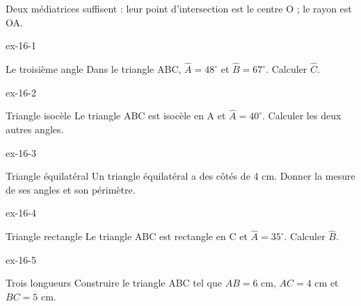 \begin{savoirfaire}Deux médiatrices suffisent : leur point d’intersection est le centre O ; le rayon est OA.\end{savoirfaire}

\clearpage{}
\begin{blocLivre}{ex-16-1}\begin{exercice}[1]{Le troisième angle}
Dans le triangle ABC, $\widehat{A}=48^\circ$ et $\widehat{B}=67^\circ$. Calculer $\widehat{C}$.
\label{fig-ex-16-1}
\end{exercice}\end{blocLivre}
\begin{blocLivre}{ex-16-2}\begin{exercice}[1]{Triangle isocèle}
Le triangle ABC est isocèle en A et $\widehat{A}=40^\circ$. Calculer les deux autres angles.
\label{fig-ex-16-2}
\end{exercice}\end{blocLivre}
\begin{blocLivre}{ex-16-3}\begin{exercice}[1]{Triangle équilatéral}
Un triangle équilatéral a des côtés de 4 cm. Donner la mesure de ses angles et son périmètre.
\label{fig-ex-16-3}
\end{exercice}\end{blocLivre}
\begin{blocLivre}{ex-16-4}\begin{exercice}[1]{Triangle rectangle}
Le triangle ABC est rectangle en C et $\widehat{A}=35^\circ$. Calculer $\widehat{B}$.
\label{fig-ex-16-4}
\end{exercice}\end{blocLivre}
\begin{blocLivre}{ex-16-5}\begin{exercice}[1]{Trois longueurs}
Construire le triangle ABC tel que $AB=6$ cm, $AC=4$ cm et $BC=5$ cm.
\label{fig-ex-16-5}
\end{exercice}\end{blocLivre}

